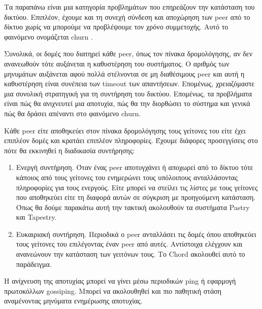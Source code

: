 Τα παραπάνω είναι μια κατηγορία προβλημάτων που επηρεάζουν την κατάσταση 
του δικτύου. Επιπλέον, έχουμε και τη συνεχή σύνδεση και αποχώρηση των 
peer από το δίκτυο χωρίς να μπορούμε να προβλέψουμε τον χρόνο 
συμμετοχής. Αυτό το φαινόμενο ονομάζεται churn \citep{Buford2009}. 

Συνολικά, οι δομές που διατηρεί κάθε peer, όπως τον πίνακα δρομολόγησης, 
αν δεν ανανεωθούν τότε αυξάνεται η καθυστέρηση του συστήματος. Ο αριθμός 
των μηνυμάτων αυξάνεται αφού πολλά στέλνονται σε μη διαθέσιμους peer και 
αυτή η καθυστέρηση είναι συνέπεια των timeout των απαντήσεων. Επομένως, 
χρειαζόμαστε μια συνολική στρατηγική για τη συντήρηση του δικτύου. 
Επομένως, τα προβλήματα είναι πώς θα ανιχνευτεί μια αποτυχία, πώς θα την 
διορθώσει το σύστημα και γενικά πώς θα δράσει απέναντι στο φαινόμενο 
churn.

Κάθε peer είτε αποθηκεύει στον πίνακα δρομολόγησης τους γείτονες του 
είτε έχει επιπλέον δομές και κρατάει επιπλέον πληροφορίες. Έχουμε 
διάφορες προσεγγίσεις στο πότε θα εκκινηθεί η διαδικασία συντήρησης:

\begin{enumerate}
\item Ενεργή συντήρηση. Όταν ένας peer αποτυγχάνει ή αποχωρεί από το 
δίκτυο τότε κάποιος από τους γείτονες του ενημερώνει τους υπόλοιπους 
ανταλλάσοντας πληροφορίες για τους ενεργούς. Είτε μπορεί να στείλει τις 
λίστες με τους γείτονες που αποθηκεύει είτε τη διαφορά αυτών σε σύγκριση 
με προηγούμενη κατάσταση. Όπως θα δούμε παρακάτω αυτή την τακτική 
ακολουθούν τα συστήματα Pastry και Tapestry.
\item Ευκαιριακή συντήρηση. Περιοδικά ο peer ανταλλάσει τις δομές όπου 
αποθηκεύει τους γείτονες του επιλέγοντας έναν peer από αυτές. Αντίστοιχα 
ελέγχουν και ανανεώνουν την κατάσταση των γειτόνων τους. Το Chord 
ακολουθεί αυτό το παράδειγμα.
\end{enumerate}

Η ανίχνευση της αποτυχίας μπορεί να γίνει μέσω περιοδικών ping ή 
εφαρμογή πρωτοκόλλων gossiping. Μπορεί να ακολουθηθεί και πιο παθητική 
στάση αναμένοντας μηνύματα ενημέρωσης αποτυχίας.

